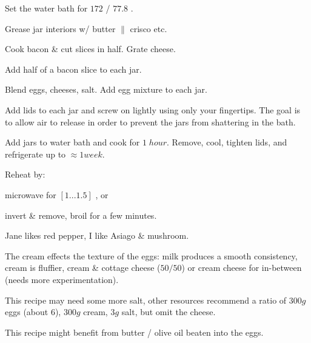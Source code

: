 \begin{preparation}
\item Set the water bath for $172$ \Fahrenheit / $77.8$ \Celsius.

\item Grease jar interiors w/ butter $\|$ crisco etc.

\item Cook bacon \& cut slices in half. Grate cheese.

\item Add half of a bacon slice to each jar.

\item Blend eggs, cheeses, salt. Add egg mixture to each jar.

\item Add lids to each jar and screw on lightly using only your fingertips. The goal is to allow air to release in order to prevent the jars from shattering in the bath.

\item Add jars to water bath and cook for $1\; hour$. Remove, cool, tighten lids, and refrigerate up to $\approx1 week$.

\item Reheat by:
\begin{inparaenum}
	\item microwave for $[1...1.5]$ \minute, or
	\item invert \& remove, broil for a few minutes.
\end{inparaenum}

\end{preparation}


\begin{variation}
	\item Jane likes red pepper, I like Asiago $\&$ mushroom.
	\item The cream effects the texture of the eggs: milk produces a smooth consistency, cream is fluffier, cream \& cottage cheese ($50/50$) or cream cheese for in-between (needs more experimentation).
\end{variation}


\begin{experiments}
\item This recipe may need some more salt, other resources recommend a ratio of $300g$ eggs (about 6), $300g$ cream, $3g$ salt, but omit the cheese.
\item This recipe might benefit from butter / olive oil beaten into the eggs.
\end{experiments}


\recipeend
